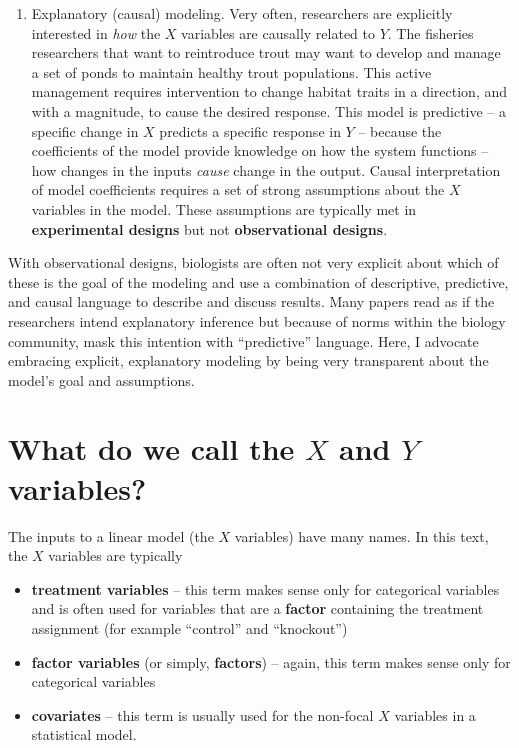 \documentclass[]{book}
\providecommand{\tightlist}{%
  \setlength{\itemsep}{0pt}\setlength{\parskip}{0pt}}
\begin{document}
\begin{enumerate}
\item
  Explanatory (causal) modeling. Very often, researchers are explicitly interested in \emph{how} the \(X\) variables are causally related to \(Y\). The fisheries researchers that want to reintroduce trout may want to develop and manage a set of ponds to maintain healthy trout populations. This active management requires intervention to change habitat traits in a direction, and with a magnitude, to cause the desired response. This model is predictive -- a specific change in \(X\) predicts a specific response in \(Y\) -- because the coefficients of the model provide knowledge on how the system functions -- how changes in the inputs \emph{cause} change in the output. Causal interpretation of model coefficients requires a set of strong assumptions about the \(X\) variables in the model. These assumptions are typically met in \textbf{experimental designs} but not \textbf{observational designs}.
\end{enumerate}

With observational designs, biologists are often not very explicit about which of these is the goal of the modeling and use a combination of descriptive, predictive, and causal language to describe and discuss results. Many papers read as if the researchers intend explanatory inference but because of norms within the biology community, mask this intention with ``predictive'' language. Here, I advocate embracing explicit, explanatory modeling by being very transparent about the model's goal and assumptions.

\hypertarget{what-do-we-call-the-x-and-y-variables}{%
\section{\texorpdfstring{What do we call the \(X\) and \(Y\) variables?}{What do we call the X and Y variables?}}\label{what-do-we-call-the-x-and-y-variables}}

The inputs to a linear model (the \(X\) variables) have many names. In this text, the \(X\) variables are typically

\begin{itemize}
\tightlist
\item
  \textbf{treatment variables} -- this term makes sense only for categorical variables and is often used for variables that are a \textbf{factor} containing the treatment assignment (for example ``control'' and ``knockout'')
\item
  \textbf{factor variables} (or simply, \textbf{factors}) -- again, this term makes sense only for categorical variables
\item
  \textbf{covariates} -- this term is usually used for the non-focal \(X\) variables in a statistical model.
\end{itemize}
\end{document}
